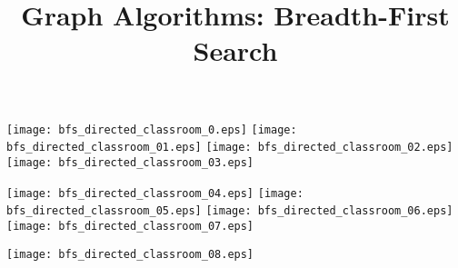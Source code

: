 \documentclass{article}
\title{Graph Algorithms: Breadth-First Search}
\begin{document}
\maketitle
{}\vspace{1em}


\vspace{1em}


\texttt{[image: bfs\_directed\_classroom\_0.eps]}
\vspace{1em}
\texttt{[image: bfs\_directed\_classroom\_01.eps]}
\vspace{1em}
\texttt{[image: bfs\_directed\_classroom\_02.eps]}
\vspace{1em}
\texttt{[image: bfs\_directed\_classroom\_03.eps]}
\vspace{1em}


\texttt{[image: bfs\_directed\_classroom\_04.eps]}
\vspace{1em}
\texttt{[image: bfs\_directed\_classroom\_05.eps]}
\vspace{1em}
\texttt{[image: bfs\_directed\_classroom\_06.eps]}
\vspace{1em}
\texttt{[image: bfs\_directed\_classroom\_07.eps]}
\vspace{1em}


\texttt{[image: bfs\_directed\_classroom\_08.eps]}
\end{document}
